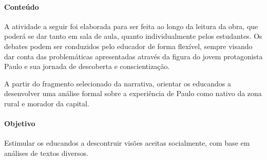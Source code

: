 \documentclass[12pt]{extarticle}
\begin{document}
\paragraph{Conteúdo}
A atividade a seguir foi elaborada para ser feita ao longo da leitura
da obra, que poderá se dar tanto em sala de aula, quanto
individualmente pelos estudantes. Os debates podem ser conduzidos pelo
educador de forma flexível, sempre visando dar conta das problemáticas
apresentadas através da figura do jovem protagonista Paulo e sua
jornada de descoberta e conscientização.

A partir do fragmento selecionado da narrativa, orientar os educandos
a desenvolver uma análise formal sobre a experiência de Paulo como
nativo da zona rural e morador da capital.

\paragraph{Objetivo}
Estimular os educandos a descontruir visões aceitas socialmente, com
base em análises de textos diversos.
\end{document}
